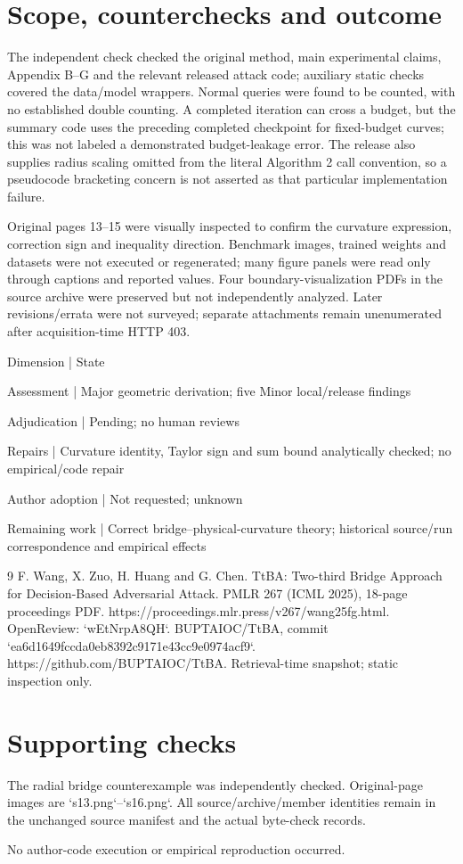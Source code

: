 \documentclass[10pt]{article}
\begin{document}
\section*{Scope, counterchecks and outcome}
The independent check checked the original method, main experimental claims, Appendix B–G and the relevant released attack code; auxiliary static checks covered the data/model wrappers. Normal queries were found to be counted, with no established double counting. A completed iteration can cross a budget, but the summary code uses the preceding completed checkpoint for fixed-budget curves; this was not labeled a demonstrated budget-leakage error. The release also supplies radius scaling omitted from the literal Algorithm 2 call convention, so a pseudocode bracketing concern is not asserted as that particular implementation failure.\par
Original pages 13–15 were visually inspected to confirm the curvature expression, correction sign and inequality direction. Benchmark images, trained weights and datasets were not executed or regenerated; many figure panels were read only through captions and reported values. Four boundary-visualization PDFs in the source archive were preserved but not independently analyzed. Later revisions/errata were not surveyed; separate attachments remain unenumerated after acquisition-time HTTP 403.\par
Dimension | State\par
Assessment | Major geometric derivation; five Minor local/release findings\par
Adjudication | Pending; no human reviews\par
Repairs | Curvature identity, Taylor sign and sum bound analytically checked; no empirical/code repair\par
Author adoption | Not requested; unknown\par
Remaining work | Correct bridge–physical-curvature theory; historical source/run correspondence and empirical effects\par
9 F. Wang, X. Zuo, H. Huang and G. Chen. TtBA: Two-third Bridge Approach for Decision-Based Adversarial Attack. PMLR 267 (ICML 2025), 18-page proceedings PDF. https://proceedings.mlr.press/v267/wang25fg.html. OpenReview: `wEtNrpA8QH`. BUPTAIOC/TtBA, commit `ea6d1649fccda0eb8392c9171e43cc9e0974acf9`. https://github.com/BUPTAIOC/TtBA. Retrieval-time snapshot; static inspection only.\par
\section*{Supporting checks}
The radial bridge counterexample was independently checked. Original-page images are `s13.png`–`s16.png`. All source/archive/member identities remain in the unchanged source manifest and the actual byte-check records.\par
No author-code execution or empirical reproduction occurred.\par
\end{document}
